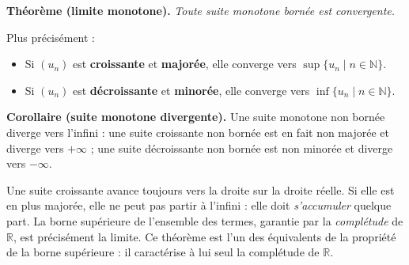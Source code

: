 ﻿%



\begin{tcolorbox}[thmbox]
  \textbf{Théorème (limite monotone).}%
  \enspace{}
  \textit{Toute suite monotone bornée
  est convergente.}

  \medskip
  Plus précisément :
  \begin{itemize}
    \item Si $(u_n)$ est \textbf{croissante} et \textbf{majorée}, elle converge
          vers $\sup\{u_n \mid n \in \mathbb{N}\}$.
    \item Si $(u_n)$ est \textbf{décroissante} et \textbf{minorée}, elle converge
          vers $\inf\{u_n \mid n \in \mathbb{N}\}$.
  \end{itemize}

  \medskip
  \textbf{Corollaire (suite monotone divergente).}\enspace%
  Une suite monotone non bornée diverge vers l'infini : une suite croissante
  non bornée est en fait non majorée et diverge vers $+\infty$ ; une suite
  décroissante non bornée est non minorée et diverge vers $-\infty$.
\end{tcolorbox}

\begin{significationintuitive}
Une suite croissante avance toujours vers la droite sur la droite réelle.
Si elle est en plus majorée, elle ne peut pas partir à l'infini : elle doit
\emph{s'accumuler} quelque part. La borne supérieure de l'ensemble des termes,
garantie par la \emph{complétude} de $\mathbb{R}$, est
précisément la limite. Ce théorème est l'un des équivalents de la propriété
de la borne supérieure : il caractérise à lui seul la complétude de $\mathbb{R}$.
\end{significationintuitive}

\decsep{}


